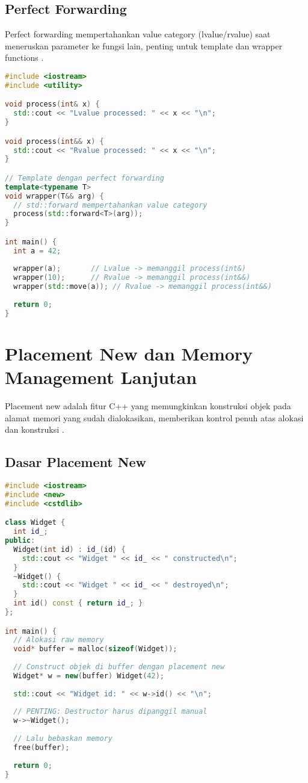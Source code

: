 \documentclass[../main.tex]{subfiles}
\begin{document}
\subsection{Perfect Forwarding}
Perfect forwarding mempertahankan value category (lvalue/rvalue) saat meneruskan parameter ke fungsi lain, penting untuk template dan wrapper functions \parencite{cpp-reference}.

\begin{lstlisting}[language=C++, caption={Perfect forwarding dengan std::forward}]
#include <iostream>
#include <utility>

void process(int& x) {
  std::cout << "Lvalue processed: " << x << "\n";
}

void process(int&& x) {
  std::cout << "Rvalue processed: " << x << "\n";
}

// Template dengan perfect forwarding
template<typename T>
void wrapper(T&& arg) {
  // std::forward mempertahankan value category
  process(std::forward<T>(arg));
}

int main() {
  int a = 42;
  
  wrapper(a);       // Lvalue -> memanggil process(int&)
  wrapper(10);      // Rvalue -> memanggil process(int&&)
  wrapper(std::move(a)); // Rvalue -> memanggil process(int&&)
  
  return 0;
}
\end{lstlisting}

\section{Placement New dan Memory Management Lanjutan}
Placement new adalah fitur C++ yang memungkinkan konstruksi objek pada alamat memori yang sudah dialokasikan, memberikan kontrol penuh atas alokasi dan konstruksi \parencite{cpp-reference}.

\subsection{Dasar Placement New}
\begin{lstlisting}[language=C++, caption={Penggunaan placement new}]
#include <iostream>
#include <new>
#include <cstdlib>

class Widget {
  int id_;
public:
  Widget(int id) : id_(id) {
    std::cout << "Widget " << id_ << " constructed\n";
  }
  ~Widget() {
    std::cout << "Widget " << id_ << " destroyed\n";
  }
  int id() const { return id_; }
};

int main() {
  // Alokasi raw memory
  void* buffer = malloc(sizeof(Widget));
  
  // Construct objek di buffer dengan placement new
  Widget* w = new(buffer) Widget(42);
  
  std::cout << "Widget id: " << w->id() << "\n";
  
  // PENTING: Destructor harus dipanggil manual
  w->~Widget();
  
  // Lalu bebaskan memory
  free(buffer);
  
  return 0;
}
\end{lstlisting}
\end{document}

